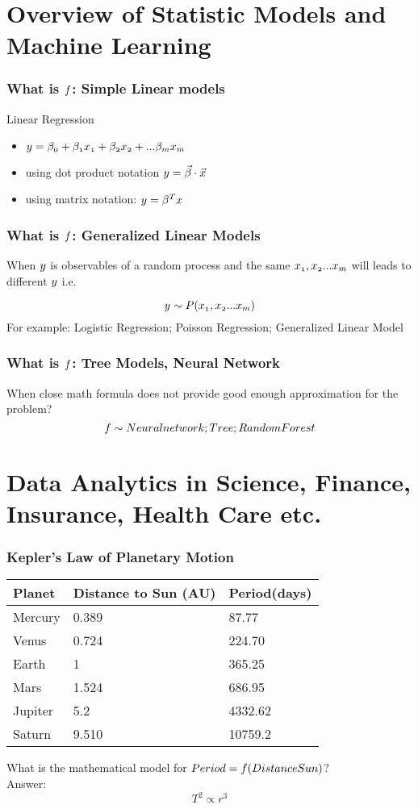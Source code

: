 \documentclass[notheorems, aspectratio=54]{beamer}
\begin{document}
\section{Overview of Statistic Models and Machine Learning}

\begin{frame}
\frametitle{What is $\mathnormal{f}$: Simple Linear models}
Linear Regression
\begin{itemize}
\item $\mathnormal{y=\beta_0+\beta_1 x_1+ \beta_2 x_2 + ... \beta_m x_m}$
\item using dot product notation $\mathnormal{y=\vec{\beta}\cdot \vec{x}}$
\item using matrix notation: $\mathnormal{y=\beta^T x}$
\end{itemize}

\end{frame}


\begin{frame}
\frametitle{What is $\mathnormal{f}$: Generalized Linear Models}
When $\mathnormal{y}$ is observables of a random process and the same $\mathnormal{x_1, x_2 ... x_m}$ will leads to different $\mathnormal{y}$ i.e.

$$\mathnormal{y\sim P(x_1, x_2 ... x_m)}$$
\vspace{0.2cm}
For example: 
Logistic Regression;
Poisson Regression;
Generalized Linear Model
\end{frame}

\begin{frame}
\frametitle{What is $\mathnormal{f}$: Tree Models, Neural Network}
When close math formula does not provide good enough approximation for the problem? \\

$$\mathnormal{f}\sim
Neural network; 
Tree; 
Random Forest
$$ 
\end{frame}

\section{Data Analytics in Science, Finance, Insurance, Health Care etc.}

\begin{frame}
\frametitle{Kepler's Law of Planetary Motion}
\begin{table}[]
\begin{tabular}{lll}
Planet &Distance to Sun (AU) &Period(days)\\
\hline
Mercury	&0.389	&87.77\\
Venus	&0.724	&224.70\\
Earth	&1	&365.25\\
Mars	&1.524	&686.95\\
Jupiter	&5.2	&4332.62\\
Saturn	&9.510	&10759.2\\
\hline
\end{tabular}
\end{table}
What is the mathematical model for $Period=\mathnormal{f}(DistanceSun)$?\\
Answer: $$T^2 \propto r^3$$
\end{frame}
\end{document}
